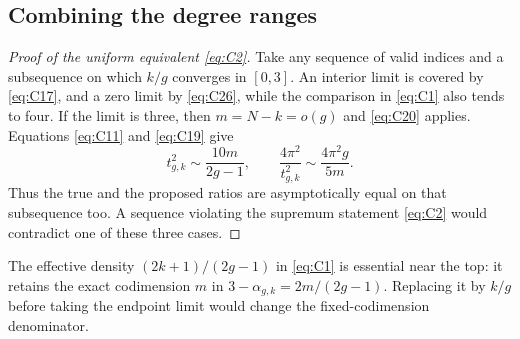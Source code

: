 \subsection{Combining the degree ranges}\label{uniformity-and-the-corrected-top-density}

\begin{proof}[Proof of the uniform equivalent \eqref{eq:C2}]
Take any sequence of valid indices and a subsequence on which \(k/g\)
converges in \([0,3]\). An interior limit is covered by \eqref{eq:C17}, and a
zero limit by \eqref{eq:C26}, while the comparison in \eqref{eq:C1} also tends to four. If
the limit is three, then \(m=N-k=o(g)\) and \eqref{eq:C20} applies. Equations
\eqref{eq:C11} and \eqref{eq:C19} give \[
 t_{g,k}^2\sim\frac{10m}{2g-1},\qquad
 \frac{4\pi^2}{t_{g,k}^2}\sim\frac{4\pi^2g}{5m}.
\] Thus the true and the proposed ratios are asymptotically equal on that
subsequence too. A sequence violating the supremum statement \eqref{eq:C2} would
contradict one of these three cases.
\end{proof}

The effective density \((2k+1)/(2g-1)\) in \eqref{eq:C1} is essential near the
top: it retains the exact codimension \(m\) in
\(3-\alpha_{g,k}=2m/(2g-1)\). Replacing it by \(k/g\) before taking the
endpoint limit would change the fixed-codimension denominator.
